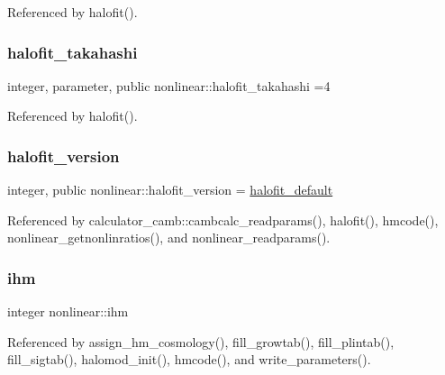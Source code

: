 Referenced by halofit().

\mbox{\label{namespacenonlinear_aac3355efc27ec1212dfc7d494c94b8bd}} 
\subsubsection{\texorpdfstring{halofit\+\_\+takahashi}{halofit\_takahashi}}
{\footnotesize\ttfamily integer, parameter, public nonlinear\+::halofit\+\_\+takahashi =4}



Referenced by halofit().

\mbox{\label{namespacenonlinear_a1f7f92360f1ca05ad5bc378c6f48c4e2}} 
\subsubsection{\texorpdfstring{halofit\+\_\+version}{halofit\_version}}
{\footnotesize\ttfamily integer, public nonlinear\+::halofit\+\_\+version = \mbox{\hyperlink{namespacenonlinear_a17d0a06b4737dd11deb01679dd462d0d}{halofit\+\_\+default}}}



Referenced by calculator\+\_\+camb\+::cambcalc\+\_\+readparams(), halofit(), hmcode(), nonlinear\+\_\+getnonlinratios(), and nonlinear\+\_\+readparams().

\mbox{\label{namespacenonlinear_aaffe0db71a291d9ca3d9e8315757f6c0}} 
\subsubsection{\texorpdfstring{ihm}{ihm}}
{\footnotesize\ttfamily integer nonlinear\+::ihm\hspace{0.3cm}{\ttfamily [private]}}



Referenced by assign\+\_\+hm\+\_\+cosmology(), fill\+\_\+growtab(), fill\+\_\+plintab(), fill\+\_\+sigtab(), halomod\+\_\+init(), hmcode(), and write\+\_\+parameters().

